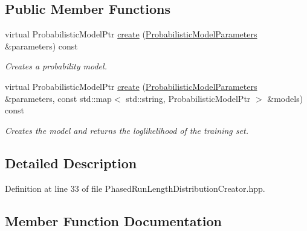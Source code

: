 \subsection*{Public Member Functions}
\begin{DoxyCompactItemize}
\item 
virtual Probabilistic\+Model\+Ptr \hyperlink{classtops_1_1PhasedRunLengthDistributionCreator_aaf3fd1675098f4f5c3e4da8f06056ab1}{create} (\hyperlink{classtops_1_1ProbabilisticModelParameters}{Probabilistic\+Model\+Parameters} \&parameters) const
\begin{DoxyCompactList}\small\item\em Creates a probability model. \end{DoxyCompactList}\item 
\mbox{\label{classtops_1_1PhasedRunLengthDistributionCreator_a8cb0095b931fde4fa86dd6ff1330cb6c}} 
virtual Probabilistic\+Model\+Ptr \hyperlink{classtops_1_1PhasedRunLengthDistributionCreator_a8cb0095b931fde4fa86dd6ff1330cb6c}{create} (\hyperlink{classtops_1_1ProbabilisticModelParameters}{Probabilistic\+Model\+Parameters} \&parameters, const std\+::map$<$ std\+::string, Probabilistic\+Model\+Ptr $>$ \&models) const
\begin{DoxyCompactList}\small\item\em Creates the model and returns the loglikelihood of the training set. \end{DoxyCompactList}\end{DoxyCompactItemize}


\subsection{Detailed Description}


Definition at line 33 of file Phased\+Run\+Length\+Distribution\+Creator.\+hpp.



\subsection{Member Function Documentation}
\mbox{\label{classtops_1_1PhasedRunLengthDistributionCreator_aaf3fd1675098f4f5c3e4da8f06056ab1}} 
